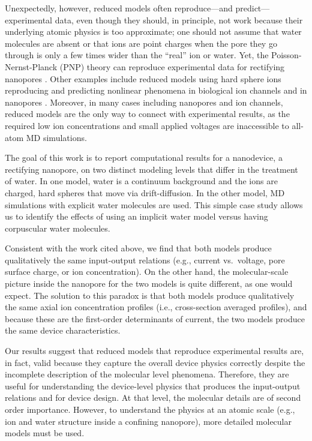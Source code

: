 \documentclass[fleqn,10pt]{SelfArx} %
\begin{document}
Unexpectedly, however, reduced models often reproduce---and predict---experimental data, even though they should, in principle, not work because their underlying atomic physics is too approximate; one should not assume that water molecules are absent or that ions are point charges when the pore they go through is only a few times wider than the ``real'' ion or water.  
Yet, the Poisson-Nernst-Planck (PNP) theory can reproduce experimental data for rectifying nanopores \cite{cervera_jcp_2006,kalman_am_2008,cheng_acsnano_2009,hoffmann_l_2013,pietschmann_pccp_2013,perezmitta_pcp_2016}.
Other examples include reduced models using hard sphere ions reproducing and predicting nonlinear phenomena in biological ion channels \cite{2000_nonner_bj_1976,gillespie-bj-95-2658-2008,gillespie-bj-2008,boda-jgp-133-497-2009,dirk-janhavi-mike,malasics-bba-1798-2013-2010,gillespie_bj_2014,boda-jpcc-118-700-2014} and in nanopores \cite{gillespie-bj-95-609-2008,he-jacs-131-5194-2009}.
Moreover, in many cases including nanopores and ion channels, reduced models are the only way to connect with experimental results, as the required low ion concentrations and small applied voltages are inaccessible to all-atom MD simulations.

The goal of this work is to report computational results for a nanodevice, a rectifying nanopore, on two distinct modeling levels that differ in the treatment of water.
In one model, water is a continuum background and the ions are charged, hard spheres that move via drift-diffusion.
In the other model, MD simulations with explicit water molecules are used.
This simple case study allows us to identify the effects of using an implicit water model versus having corpuscular water molecules.

Consistent with the work cited above, we find that both models produce qualitatively the same input-output relations (e.g., current vs.\ voltage, pore surface charge, or ion concentration).
On the other hand, the molecular-scale picture inside the nanopore for the two models is quite different, as one would expect.
The solution to this paradox is that both models produce qualitatively the same axial ion concentration profiles (i.e., cross-section averaged profiles), and because these are the first-order determinants of current, the two models produce the same device characteristics.

Our results suggest that reduced models that reproduce experimental results are, in fact, valid because they capture the overall device physics correctly despite the incomplete description of the molecular level phenomena.
Therefore, they are useful for understanding the device-level physics that produces the input-output relations and for device design.
At that level, the molecular details are of second order importance.
However, to understand the physics at an atomic scale (e.g., ion and water structure inside a confining nanopore), more detailed molecular models must be used.
\end{document}
